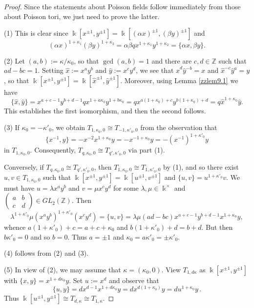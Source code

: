 \documentclass[12pt]{amsart}
\theoremstyle{plain}
\numberwithin{theorem}{section}
\numberwithin{equation}{theorem}
\theoremstyle{definition}
\newcommand{\ZZ}{\mathbb{Z}}
\newcommand \xhat {\hat{x}}
\newcommand \yhat {\hat{y}}
\newcommand \kx {\Bbbk^\times}
\begin{document}
\begin{proof}
Since the statements about Poisson fields follow immediately from those about Poisson tori, we just need to prove the latter.

(1) This is clear since $\Bbbk[x^{\pm1}, y^{\pm1}] = \Bbbk[(\alpha x)^{\pm1}, (\beta y)^{\pm1}]$ and
$$
(\alpha x)^{1+\kappa_1} (\beta y)^{1+\kappa_2} = \alpha \beta q x^{1+\kappa_1} y^{1+\kappa_2} = \{ \alpha x, \beta y \}.
$$

(2) Let $(a,b) := \kappa/\kappa_0$, so that $\gcd(a,b) = 1$ and there are $c,d \in \ZZ$ such that $ad-bc = 1$.  Setting $\xhat := x^a y^b$ and $\yhat := x^c y^d$, we see that $\xhat^d \yhat^{-b} = x$ and $\xhat^{-c} \yhat^a = y$, so that $\Bbbk[x^{\pm1}, y^{\pm1}] = \Bbbk[\xhat^{\pm1}, \yhat^{\pm1}]$.  Moreover, using Lemma \ref{zzlem9.1} we have 
$$
\{\xhat,\yhat\} = x^{a+c-1} y^{b+d-1} q x^{1+a\kappa_0} y^{1+b\kappa_0} = q x^{a(1+\kappa_0)+c} y^{b(1+\kappa_0)+d} = q \xhat^{1+\kappa_0} \yhat.
$$
This establishes the first isomorphism, and then the second follows.

(3) If $\kappa_0 = - \kappa'_0$, we obtain $T_{1,\kappa_0,0} \cong T_{-1,\kappa'_0,0}$ from the observation that 
$$
\{x^{-1},y\} = - x^{-2} x^{1+\kappa_0} y = - x^{-1+\kappa_0} y = - (x^{-1})^{1+\kappa'_0} y
$$
in $T_{1,\kappa_0,0}$.  Consequently, $T_{q,\kappa_0,0} \cong T_{q',\kappa'_0,0}$ via part (1).

Conversely, if $T_{q,\kappa_0,0} \cong T_{q',\kappa'_0,0}$, then $T_{1,\kappa_0,0} \cong T_{1,\kappa'_0,0}$ by (1), and so there exist $u,v \in T_{1,\kappa_0,0}$ such that $\Bbbk[x^{\pm1}, y^{\pm1}] = \Bbbk[u^{\pm1}, v^{\pm1}]$ and $\{u,v\} = u^{1+\kappa'_0} v$.  We must have $u = \lambda x^a y^b$ and $v = \mu x^c y^d$ for some $\lambda,\mu \in \kx$ and $\left( \begin{smallmatrix} a&b\\ c&d \end{smallmatrix} \right) \in GL_2(\ZZ)$.  Then
$$
\lambda^{1+\kappa'_0} \mu (x^a y^b)^{1+\kappa'_0} (x^c y^d) = \{u,v\} = \lambda \mu (ad-bc) x^{a+c-1} y^{b+d-1} x^{1+\kappa_0} y,
$$
whence $a(1+\kappa'_0)+c = a+c+\kappa_0$ and $b(1+\kappa'_0)+d = b+d$.  But then $b \kappa'_0 = 0$ and so $b=0$.  Thus $a = \pm1$ and $\kappa_0 = a\kappa'_0 = \pm\kappa'_0$.

(4) follows from (2) and (3).

(5) In view of (2), we may assume that $\kappa = (\kappa_0,0)$.  View $T_{1,d\kappa}$ as $\Bbbk[x^{\pm1}, y^{\pm1}]$ with $\{x,y\} = x^{1+d\kappa_0} y$.  Set $u := x^d$ and observe that
$$
\{u,y\} = d x^{d-1} x^{1+d\kappa_0} y = d x^{d(1+\kappa_0)} y = d u^{1+\kappa_0} y \,.
$$
Thus $\Bbbk[u^{\pm1},y^{\pm1}] \cong T_{d,\kappa} \cong T_{1,\kappa}$.


\end{proof}
\end{document}
